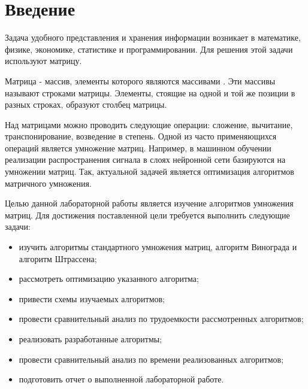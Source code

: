 \chapter*{Введение}

Задача удобного представления и хранения информации возникает в математике, физике, экономике, статистике и программировании. Для решения этой задачи используют матрицу.

Матрица - массив, элементы которого являются массивами \cite{virt}. Эти массивы называют строками матрицы. Элементы, стоящие на одной и той же позиции в разных строках, образуют столбец матрицы.

Над матрицами можно проводить следующие операции: сложение, вычитание, транспонирование, возведение в степень. Одной из часто применяющихся операций является умножение матриц. Например, в машинном обучении реализации распространения сигнала в слоях нейронной сети базируются на умножении матриц. Так, актуальной задачей является оптимизация алгоритмов матричного умножения.

Целью данной лабораторной работы является изучение алгоритмов умножения матриц. Для достижения поставленной цели требуется выполнить следующие задачи:

\begin{itemize}
    \item изучить алгоритмы стандартного умножения матриц, алгоритм Винограда и алгоритм Штрассена;
    \item рассмотреть оптимизацию указанного алгоритма;
    \item привести схемы изучаемых алгоритмов;
    \item провести сравнительный анализ по трудоемкости рассмотренных алгоритмов;
    \item реализовать разработанные алгоритмы;
    \item провести сравнительный анализ по времени реализованных алгоритмов;
    \item подготовить отчет о выполненной лабораторной работе.
\end{itemize}
